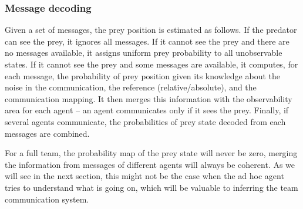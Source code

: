 \subsubsection*{Message decoding}

Given a set of messages, the prey position is estimated as follows. If the predator can see the prey, it ignores all messages. If it cannot see the prey and there are no messages available, it assigns uniform prey probability to all unobservable states.  If it cannot see the prey and some messages are available, it computes, for each message, the probability of prey position given its knowledge about the noise in the communication, the reference (relative/absolute), and the communication mapping. It then merges this information with the observability area for each agent -- an agent communicates only if it sees the prey. Finally, if several agents communicate, the probabilities of prey state decoded from each messages are combined.%

For a full team, the probability map of the prey state will never be zero, merging the information from messages of different agents will always be coherent. As we will see in the next section, this might not be the case when the ad hoc agent tries to understand what is going on, which will be valuable to inferring the team communication system.%
